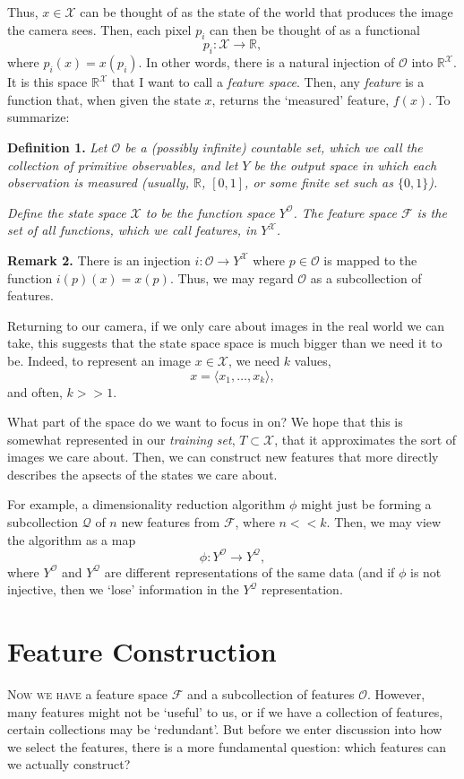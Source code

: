 \documentclass[10]{article}
\providecommand{\bbR}{\mathbb{R}}
\theoremstyle{plain}
\begin{document}
Thus, $x \in \mathcal{X}$ can be thought of as the state of the world that produces the image the camera sees. Then, each pixel $p_i$ can then be thought of as a functional
\[p_i: \mathcal{X} \to \bbR,\]
where $p_i(x) = x(p_i)$. In other words, there is a natural injection of $\mathcal{O}$ into $\bbR^\mathcal{X}$. It is this space $\bbR^\mathcal{X}$ that I want to call a \emph{feature space}. Then, any \emph{feature} is a function that, when given the state $x$, returns the `measured' feature, $f(x)$. To summarize:

\textbf{Definition 1.} \emph{Let $\mathcal{O}$ be a (possibly infinite) countable set, which we call the collection of \emph{primitive observables}, and let $Y$ be the \emph{output space} in which each observation is measured (usually, $\bbR$, $[0,1]$, or some finite set such as $\{0,1\}$).}

\emph{Define the \emph{state space} $\mathcal{X}$ to be the function space $Y^\mathcal{O}$. The \emph{feature space} $\mathcal{F}$ is the set of all functions, which we call \emph{features}, in $Y^\mathcal{X}$. }


\textbf{Remark 2.}
There is an injection $i: \mathcal{O} \rightarrow Y^\mathcal{X}$ where $p \in \mathcal{O}$ is mapped to the function $i(p)(x) = x(p)$. Thus, we may regard $\mathcal{O}$ as a subcollection of features.


Returning to our camera, if we only care about images in the real world we can take, this suggests that the state space space is much bigger than we need it to be. Indeed, to represent an image $x \in \mathcal{X}$, we need $k$ values,
\[x = \langle x_1,\dotsc, x_k\rangle,\]
and often, $k >> 1$.

What part of the space do we want to focus in on? We hope that this is somewhat represented in our \emph{training set}, $T \subset \mathcal{X}$, that it approximates the sort of images we care about. Then, we can construct new features that more directly describes the apsects of the states we care about. 

For example, a dimensionality reduction algorithm $\phi$ might just be forming a subcollection $\mathcal{Q}$ of $n$ new features from $\mathcal{F}$, where $n << k$. Then, we may view the algorithm as a map
\[\phi: Y^\mathcal{O} \to Y^\mathcal{Q},\]
where $Y^\mathcal{O}$ and $Y^\mathcal{Q}$ are different representations of the same data (and if $\phi$ is not injective, then we `lose' information in the $Y^\mathcal{Q}$ representation.

\section{Feature Construction}
\textsc{Now we have} a feature space $\mathcal{F}$ and a subcollection of features $\mathcal{O}$. However, many features might not be `useful' to us, or if we have a collection of features, certain collections may be `redundant'. But before we enter discussion into how we select the features, there is a more fundamental question: which features can we actually construct?
\end{document}
